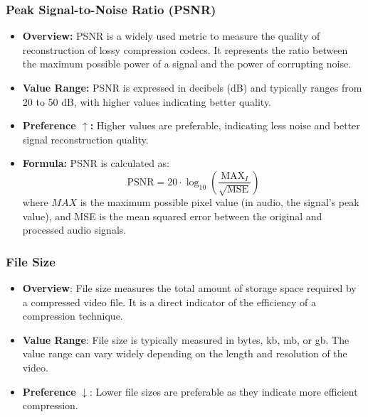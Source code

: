 \documentclass{ioereport}
\begin{document}
\subsubsection{Peak Signal-to-Noise Ratio (PSNR)}
\begin{itemize}
    \item \textbf{Overview:} PSNR is a widely used metric to measure the quality of reconstruction of lossy compression codecs. It represents the ratio between the maximum possible power of a signal and the power of corrupting noise.
    
    \item \textbf{Value Range:} PSNR is expressed in decibels (dB) and typically ranges from 20 to 50 dB, with higher values indicating better quality.
    
    \item \textbf{Preference $\uparrow$:} Higher values are preferable, indicating less noise and better signal reconstruction quality.
    
    \item \textbf{Formula:} PSNR is calculated as:
    \begin{equation}
        \text{PSNR} = 20 \cdot \log_{10}\left(\frac{{\text{MAX}_I}}{\sqrt{\text{MSE}}}\right)
    \end{equation}
    where \( MAX \) is the maximum possible pixel value (in audio, the signal's peak value), and MSE is the mean squared error between the original and processed audio signals.
\end{itemize}

\subsubsection{File Size}
            \begin{itemize}
                \item \textbf{Overview}: File size measures the total amount of storage space required by a compressed video file. It is a direct indicator of the efficiency of a compression technique.
                \item \textbf{Value Range}: File size is typically measured in bytes, \gls{kb}, \gls{mb}, or \gls{gb}. The value range can vary widely depending on the length and resolution of the video.
                \item \textbf{Preference} $\downarrow$: Lower file sizes are preferable as they indicate more efficient compression.
            \end{itemize}
\end{document}
